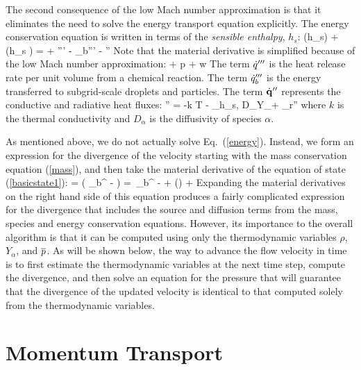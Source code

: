 The second consequence of the low Mach number approximation is that it eliminates the need to solve the energy transport
equation explicitly.
The energy conservation equation is written in terms of the {\em sensible enthalpy}, $h_s$:
\be {}(\rho h_s) + \nabla\!\cdot (\rho h_s \bu) =   + \dq''' - \dq_b'''
        - \nabla\!\cdot \dbq'' \label{energy} \ee
Note that the material derivative is simplified because of the low Mach number approximation:
\be
    \equiv {} + \bu \cdot \nabla p \approx
    + w 
\ee
The term
$\dot{q}'''$ is the heat release rate per unit volume from a chemical reaction.
The term $\dot{q}_b'''$ is the energy transferred to subgrid-scale droplets and particles.
The term $\dot{\bf q}''$ represents the conductive and radiative heat fluxes:
\be \dbq'' = -k \nabla T - \sum_\alpha h_{s,\alpha} \rho D_\alpha \nabla Y_\alpha + \dbq_r'' \ee
where $k$ is the thermal conductivity and $D_\alpha$ is the diffusivity of species $\alpha$.

As mentioned above, we do not actually solve Eq.~(\ref{energy}). Instead, we form an expression for the divergence of
the velocity starting with the mass conservation equation (\ref{mass}), and then take the material
derivative of the equation of state (\ref{basicstate1}):
\be
\label{eqn_simplediv1}
\Div{} =  \left( _b^{\tripleprime} -   \right) =
 \,_b^{\tripleprime} -    +
 \left(\right) +
 
\ee
Expanding the material derivatives on the right hand side of this equation produces a fairly complicated expression for
the divergence that includes the source and diffusion terms from the mass, species and energy conservation equations.
However, its importance to the overall algorithm is that it can be computed using only the
thermodynamic variables $\rho$, $Y_\alpha$, and $\overline{p}$. As will be shown below, the way to advance the flow velocity in time
is to first estimate the thermodynamic variables at the next time step, compute the divergence, and then solve an equation
for the pressure that will guarantee that the divergence of the updated velocity is identical to that computed solely from
the thermodynamic variables.



\section{Momentum Transport}

